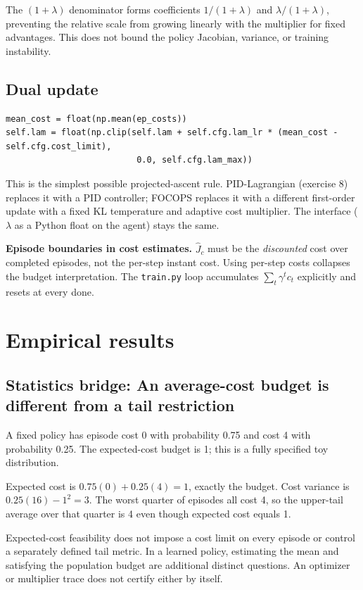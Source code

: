 \documentclass[11pt,oneside]{scrbook}
\begin{document}
The $(1+\lambda)$ denominator forms coefficients $1/(1+\lambda)$ and
$\lambda/(1+\lambda)$, preventing the relative scale from growing linearly
with the multiplier for fixed advantages. This does not bound the policy
Jacobian, variance, or training instability.

\section{Dual update}

\begin{verbatim}
mean_cost = float(np.mean(ep_costs))
self.lam = float(np.clip(self.lam + self.cfg.lam_lr * (mean_cost - self.cfg.cost_limit),
                          0.0, self.cfg.lam_max))
\end{verbatim}

This is the simplest possible projected-ascent rule. PID-Lagrangian
(exercise 8) replaces it with a PID controller; FOCOPS replaces it with a
different first-order update with a fixed KL temperature and adaptive cost multiplier. The interface ($\lambda$ as a Python float on the
agent) stays the same.

\begin{pitfall}
\textbf{Episode boundaries in cost estimates.} $\hat J_c$ must be the
\emph{discounted} cost over completed episodes, not the per-step instant
cost. Using per-step costs collapses the budget interpretation. The
\texttt{train.py} loop accumulates $\sum_t \gamma^t c_t$ explicitly and
resets at every done.
\end{pitfall}

\chapter{Empirical results}

\section{Statistics bridge: An average-cost budget is different from a tail restriction}
\begin{example}
A fixed policy has episode cost 0 with probability 0.75 and cost 4 with probability 0.25. The expected-cost budget is 1; this is a fully specified toy distribution.

Expected cost is $0.75(0)+0.25(4)=1$, exactly the budget. Cost variance is $0.25(16)-1^2=3$. The worst quarter of episodes all cost 4, so the upper-tail average over that quarter is 4 even though expected cost equals 1.
\end{example}
Expected-cost feasibility does not impose a cost limit on every episode or control a separately defined tail metric. In a learned policy, estimating the mean and satisfying the population budget are additional distinct questions. An optimizer or multiplier trace does not certify either by itself.
\end{document}
